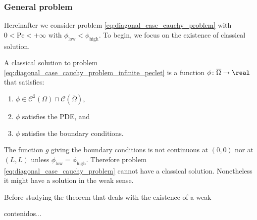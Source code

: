 \subsubsection{General problem}

Hereinafter we consider problem \eqref{eq:diagonal_case_cauchy_problem} with $0
< \mathrm{Pe} < +\infty$ with $\phi_\text{low} < \phi_\text{high}$. To begin, we
focus on the existence of classical solution.

\begin{definition}
	A classical solution to problem
	\eqref{eq:diagonal_case_cauchy_problem_infinite_peclet} is a function $\phi
	\colon \overline{\Omega} \rightarrow \real$ that satisfies:
	\begin{enumerate}[label={(\roman*)}, topsep=0pt]
		\item $\phi \in \mathcal{C}^2(\Omega) \cap
		\mathcal{C}(\overline{\Omega})$,
		\item $\phi$ satisfies the PDE, and
		\item $\phi$ satisfies the boundary conditions.
	\end{enumerate}
\end{definition}

\noindent
The function $g$ giving the boundary conditions is not continuous at $(0,0)$ nor
at $(L, L)$ unless $\phi_\text{low} = \phi_\text{high}$. Therefore problem
\eqref{eq:diagonal_case_cauchy_problem} cannot have a classical solution.
Nonetheless it might have a solution in the weak sense.

Before studying the theorem that deals with the existence of a weak 

\begin{definition}
	contenidos...
\end{definition}